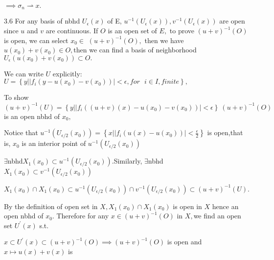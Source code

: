 \documentclass{article}
\begin{document}
$\implies \sigma _{n}\rightharpoonup x.$

3.6 For any basis of nbhd $U_{\epsilon }\left( x\right) $ of E, $%
u^{-1}\left( U_{\epsilon }\left( x\right) \right) ,v^{-1}\left( U_{\epsilon
}\left( x\right) \right) $ are open since $u$ and $v$ are continuous. If $O$
is an open set of $E,$ to prove $\left( u+v\right) ^{-1}\left( O\right) $ is
open, we can select $x_{0}\in $ $\left( u+v\right) ^{-1}\left( O\right) ,$%
then we have $u\left( x_{0}\right) +v\left( x_{0}\right) \in O,$then we can
find a basis of neighborhood $U_{\epsilon }\left( u\left( x_{0}\right)
+v\left( x_{0}\right) \right) \subset O.$

We can write $U$ explicitly:$U=\left\{ y|\left\vert f_{i}\left( y-u\left(
x_{0}\right) -v\left( x_{0}\right) \right) \right\vert <\epsilon ,for\text{ }%
i\in I,finite\right\} ,$

To show $\left( u+v\right) ^{-1}\left( U\right) =\left\{ y|\left\vert
f_{i}\left( \left( u+v\right) \left( x\right) -u\left( x_{0}\right) -v\left(
x_{0}\right) \right) \right\vert <\epsilon \right\} \ \left( u+v\right)
^{-1}\left( O\right) $is an open nbhd of $x_{0},$

Notice that $u^{-1}\left( U_{\epsilon /2}\left( x_{0}\right) \right)
=\left\{ x|\left\vert f_{i}\left( u\left( x\right) -u\left( x_{0}\right)
\right) \right\vert <\frac{\epsilon }{2}\right\} $ is open,that is, $x_{0}$
is an interior point of $u^{-1}\left( U_{\epsilon /2}\left( x_{0}\right)
\right) $

$\exists $nbhd$X_{1}\left( x_{0}\right) \subset u^{-1}\left( U_{\epsilon
/2}\left( x_{0}\right) \right) .$Similarly, $\exists $nbhd$X_{1}\left(
x_{0}\right) \subset v^{-1}\left( U_{\epsilon /2}\left( x_{0}\right) \right) 
$

$X_{1}\left( x_{0}\right) \cap X_{1}\left( x_{0}\right) \subset u^{-1}\left(
U_{\epsilon /2}\left( x_{0}\right) \right) \cap v^{-1}\left( U_{\epsilon
/2}\left( x_{0}\right) \right) \subset \left( u+v\right) ^{-1}\left(
U\right) .$

By the definition of open set in $X,X_{1}\left( x_{0}\right) \cap
X_{1}\left( x_{0}\right) $ is open in $X$ hence an open nbhd of $x_{0}.$%
Therefore for any $x\in \left( u+v\right) ^{-1}\left( O\right) $ in $X,$we
find an open set $U^{\prime }\left( x\right) $ s.t.

$x\subset U^{\prime }\left( x\right) \subset \left( u+v\right) ^{-1}\left(
O\right) \implies \left( u+v\right) ^{-1}\left( O\right) $ is open and $%
x\longmapsto u\left( x\right) +v\left( x\right) $ is
\end{document}
